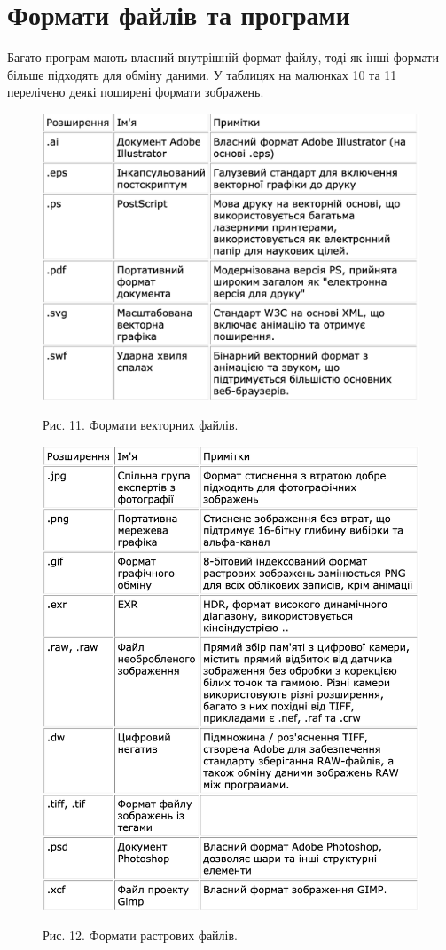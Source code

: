 \documentclass[a4paper,12pt]{article}
\begin{document}
    \section{Формати файлів та програми}\label{sec:image_formats}
    Багато програм мають власний внутрішній формат файлу, тоді як інші формати більше підходять для обміну даними.
    У таблицях на малюнках 10 та 11 перелічено деякі поширені формати зображень.

    \begin{figure}
        \label{fig:image11}
        \centering
        \includegraphics[scale=0.5]{image11.png}

        Рис. 11. Формати векторних файлів.
    \end{figure}

    \begin{figure}
        \label{fig:image12}
        \centering
        \includegraphics[scale=0.5]{image12.png}

        Рис. 12. Формати растрових файлів.
    \end{figure}

    \newpage

    \printbibliography[title={Список Літератури}]
\end{document}

